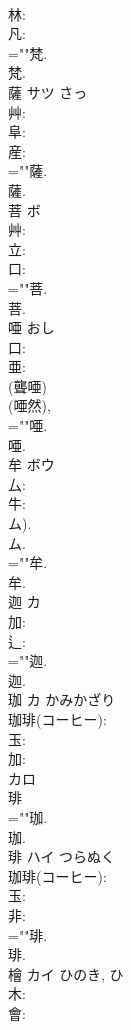 \documentclass[8pt]{extreport}
\begin{document}
\begin{CJK}{UTF8}{min}
\\	林: 
\\	凡: 
\\	=""梵.
\\	梵.
\\	薩	サツ		さっ	
\\	艸: 
\\	阜: 
\\	産: 
\\	=""薩.
\\	薩.
\\	菩	ボ			
\\	艸: 
\\	立: 
\\	口: 
\\	=""菩.
\\	菩.
\\	唖		おし				
\\	口: 
\\	亜: 
\\	(聾唖) 
\\	(唖然), 
\\	=""唖.
\\	唖.
\\	牟	ボウ			
\\	厶: 
\\	牛: 
\\	ム).
\\	ム.
\\	=""牟.
\\	牟.
\\	迦	カ			
\\	加: 
\\	辶: 
\\	=""迦.
\\	迦.
\\	珈	カ	かみかざり		
\\	珈琲(コーヒー): 
\\	玉: 
\\	加: 
\\	カロ
\\	琲 
\\	=""珈.
\\	珈.
\\	琲	ハイ	つらぬく		
\\	珈琲(コーヒー): 
\\	玉: 
\\	非: 
\\	=""琲.
\\	琲.
\\	檜	カイ	ひのき, ひ		
\\	木: 
\\	會: 

\end{CJK}
\end{document}
